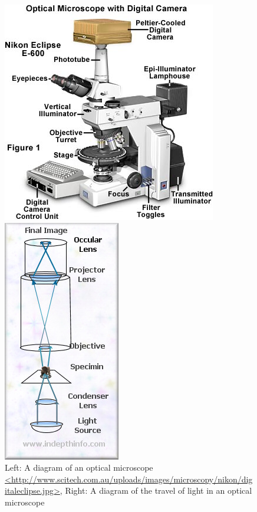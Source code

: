 \documentclass{article}
\begin{document}
\begin{figure}[h]
	\begin{minipage}{.5\textwidth}
		\centering
		\includegraphics[scale=.2]{optical1.jpg}
	\end{minipage}		
	\begin{minipage}{.5\textwidth}
		\centering
		\includegraphics[scale=1.1]{optical2.jpg}
	\end{minipage}
	\caption{Left: A diagram of an optical microscope \url{<http://www.scitech.com.au/uploads/images/microscopy/nikon/digitaleclipse.jpg>}, Right: A diagram of the travel of light in an optical microscope}
\end{figure}
\end{document}
